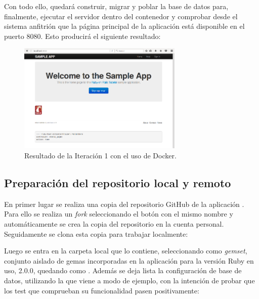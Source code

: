 Con todo ello, quedará construir, migrar y poblar la base de datos para, finalmente, ejecutar el servidor  dentro del contenedor  y comprobar desde el sistema anfitrión que la página principal de la aplicación  está disponible en el puerto 8080. Esto producirá el siguiente resultado:

\begin{figure}[H]
\centering
\includegraphics[width=0.7\textwidth]{images/figures/resultado1.png}
\caption{Resultado de la Iteración 1 con el uso de Docker.}
\end{figure}

\subsection{Preparación del repositorio local y remoto}

En primer lugar se realiza una copia del repositorio GitHub de la aplicación . Para ello se realiza un \textit{fork} seleccionando el botón con el mismo nombre y automáticamente se crea la copia del repositorio en la cuenta personal. Seguidamente se clona esta copia para trabajar localmente:


Luego se entra en la carpeta local que lo contiene, seleccionando como \textit{gemset}, conjunto aislado de gemas incorporadas en la aplicación para la versión Ruby en uso, 2.0.0, quedando como . Además se deja lista la configuración de base de datos, utilizando la que viene a modo de ejemplo, con la intención de probar que los test que comprueban su funcionalidad pasen positivamente: 

